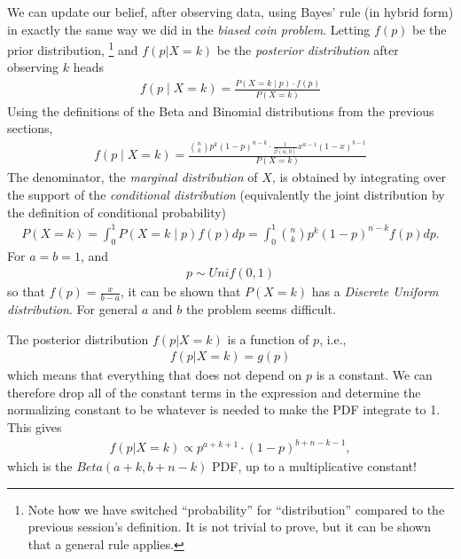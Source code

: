 We can update our belief, 
after observing data, 
using Bayes' rule (in hybrid form) 
in exactly the same way we did in the \emph{biased coin problem}. 
Letting \(f(p)\) be the prior distribution,%
\footnote{Note how we have 
switched ``probability'' for ``distribution'' compared 
to the previous session's definition. 
It is not trivial to prove, 
but it can be shown that a general rule applies.} 
and \(f(p|X = k)\) be the \emph{posterior distribution} after observing \(k\) heads
\begin{align}
f\left( p \middle| X = k \right) = 
\frac{P\left( X = k \middle| p \right) \cdot f(p)}{P(X = k)}
\end{align}
Using the definitions of the Beta and Binomial distributions from the previous sections,
\begin{align}
f\left( p \middle| X = k \right) = 
\frac{\binom{n}{k}p^{k}(1 - p)^{n - k} \cdot \frac{1}{\beta(a,b)}x^{a - 1}(1 - x)^{b - 1}}{P(X = k)}
\end{align}
The denominator, 
the \emph{marginal distribution} of \(X\), 
is obtained by integrating over the support of the 
\emph{conditional distribution} (equivalently the joint distribution 
by the definition of conditional probability)
\begin{align}
P(X = k) = \int_{0}^{1}{P\left( X = k \middle| p \right)f(p)dp} = 
\int_{0}^{1}{\binom{n}{k}p^{k}(1 - p)^{n - k}f(p)dp}.
\end{align}
For \(a = b = 1\), and
\begin{align}
p \sim Unif(0,1)
\end{align}
so that \(f(p) = \frac{x}{b - a}\), 
it can be shown that \(P(X = k)\) has a \emph{Discrete Uniform distribution}. 
For general \(a\) and \(b\) the problem seems difficult.

The posterior distribution \(f(p|X = k)\) is a function of \(p\), i.e.,
\begin{align}
f\left( p | X = k \right) = g(p)
\end{align}
which means that everything that does not depend on \(p\) is a constant.
We can therefore drop all of the constant terms in the expression and
determine the normalizing constant to be whatever is needed to make the
PDF integrate to 1. 
This gives
\begin{align}
f\left( p | X = k \right) \propto 
p^{a + k + 1} \cdot (1 - p)^{b + n - k - 1},
\end{align}
which is the \(Beta(a + k,b + n - k)\) PDF, 
up to a multiplicative constant! 

